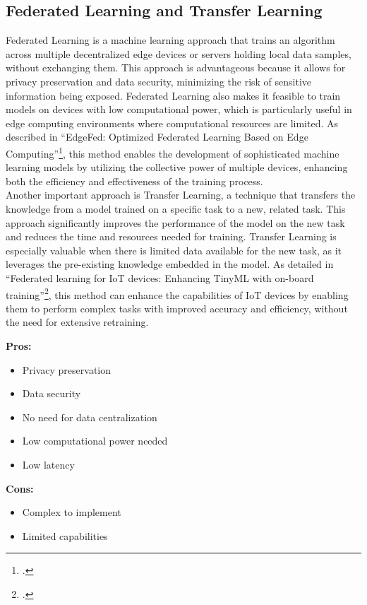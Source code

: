 \subsection{Federated Learning and Transfer Learning}
Federated Learning is a machine learning approach that trains an algorithm across multiple decentralized edge devices or servers holding local data samples, without exchanging them. This approach is advantageous because it allows for privacy preservation and data security, minimizing the risk of sensitive information being exposed. Federated Learning also makes it feasible to train models on devices with low computational power, which is particularly useful in edge computing environments where computational resources are limited. As described in \enquote{EdgeFed: Optimized Federated Learning Based on Edge Computing}\footcite{9260194}, this method enables the development of sophisticated machine learning models by utilizing the collective power of multiple devices, enhancing both the efficiency and effectiveness of the training process.
\\
Another important approach is Transfer Learning, a technique that transfers the knowledge from a model trained on a specific task to a new, related task. This approach significantly improves the performance of the model on the new task and reduces the time and resources needed for training. Transfer Learning is especially valuable when there is limited data available for the new task, as it leverages the pre-existing knowledge embedded in the model. As detailed in \enquote{Federated learning for IoT devices: Enhancing TinyML with on-board training}\footcite{FICCO2024102189}, this method can enhance the capabilities of IoT devices by enabling them to perform complex tasks with improved accuracy and efficiency, without the need for extensive retraining.

\textbf{Pros:}
\begin{itemize}
    \item Privacy preservation
    \item Data security
    \item No need for data centralization
    \item Low computational power needed
    \item Low latency
\end{itemize}
\textbf{Cons:}
\begin{itemize}
    \item Complex to implement
    \item Limited capabilities
\end{itemize}